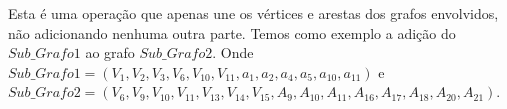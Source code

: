 \documentclass[
12pt,
a4paper,
semrecuonosumario,
sumario = abnt-6027-2012]{report}
\begin{document}
        Esta é uma operação que apenas une os vértices e arestas dos grafos envolvidos, não adicionando nenhuma outra parte.
        Temos como exemplo a adição do $Sub\_Grafo1$ ao grafo $Sub\_Grafo2$.
        Onde $Sub\_Grafo1 = (V_1, V_2, V_3, V_6, V_{10}, V_{11}, a_1, a_2, a_4, a_5, a_{10}, a_{11} )$ e $Sub\_Grafo2 = (V_6, V_9, V_{10}, V_{11}, V_{13}, V_{14}, V_{15}, A_{9}, A_{10}, A_{11}, A_{16}, A_{17}, A_{18}, A_{20}, A_{21})$.

        \begin{figure}[!htb]
            \centering %


\end{figure}
\end{document}
